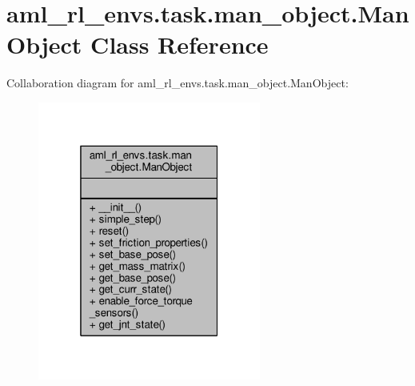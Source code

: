 \hypertarget{classaml__rl__envs_1_1task_1_1man__object_1_1_man_object}{\section{aml\-\_\-rl\-\_\-envs.\-task.\-man\-\_\-object.\-Man\-Object Class Reference}
\label{classaml__rl__envs_1_1task_1_1man__object_1_1_man_object}
}


Collaboration diagram for aml\-\_\-rl\-\_\-envs.\-task.\-man\-\_\-object.\-Man\-Object\-:
\nopagebreak
\begin{figure}[H]
\begin{center}
\leavevmode
\includegraphics[width=208pt]{classaml__rl__envs_1_1task_1_1man__object_1_1_man_object__coll__graph}
\end{center}
\end{figure}
